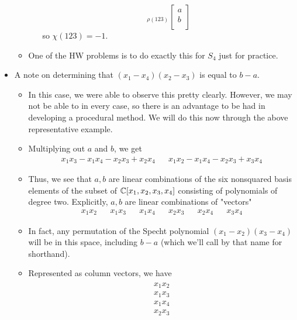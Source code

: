 \documentclass[../notes.tex]{subfiles}
\begin{document}
\begin{itemize}
\begin{itemize}
\begin{itemize}
\begin{equation*}
{                }_{\rho(123)}
                \begin{bmatrix}
                    a\\
                    b\\
                \end{bmatrix}
            \end{equation*}
            so $\chi(123)=-1$.
        \end{itemize}
        \item One of the HW problems is to do exactly this for $S_4$ just for practice.
    \end{itemize}
    \item A note on determining that $(x_1-x_4)(x_2-x_3)$ is equal to $b-a$.
    \begin{itemize}
        \item In this case, we were able to observe this pretty clearly. However, we may not be able to in every case, so there is an advantage to be had in developing a procedural method. We will do this now through the above representative example.
        \item Multiplying out $a$ and $b$, we get
        \begin{align*}
            x_1x_3-x_1x_4-x_2x_3+x_2x_4&&
            x_1x_2-x_1x_4-x_2x_3+x_3x_4
        \end{align*}
        \item Thus, we see that $a,b$ are linear combinations of the six nonsquared basis elements of the subset of $\mathbb{C}[x_1,x_2,x_3,x_4]$ consisting of polynomials of degree two. Explicitly, $a,b$ are linear combinations of "vectors"
        \begin{align*}
            x_1x_2&&
            x_1x_3&&
            x_1x_4&&
            x_2x_3&&
            x_2x_4&&
            x_3x_4
        \end{align*}
        \item In fact, any permutation of the Specht polynomial $(x_1-x_2)(x_3-x_4)$ will be in this space, including $b-a$ (which we'll call by that name for shorthand).
        \item Represented as column vectors, we have
        \begin{align*}
            \begin{matrix}
                x_1x_2\\
                x_1x_3\\
                x_1x_4\\
                x_2x_3\\

\end{matrix}
\end{align*}
\end{itemize}
\end{itemize}
\end{document}
